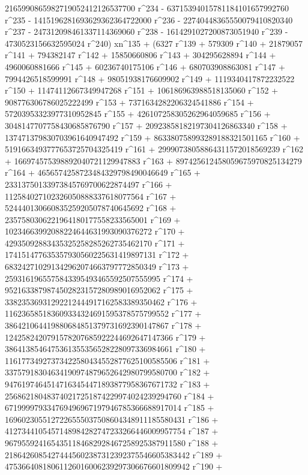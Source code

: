        2165990865982719052412126537700 r^234 - 
       63715394015781184101657992760 r^235 - 
       1415196281693629362364722000 r^236 - 
       22740448365550079410820340 r^237 - 
       247312098461337114369060 r^238 - 
       1614291027200873051940 r^239 - 
       4730523156632595024 r^240) xn^135 + (6327 r^139 + 
       579309 r^140 + 21879057 r^141 + 794382147 r^142 + 
       15850660806 r^143 + 304295628894 r^144 + 4960060881666 r^145 + 
       60236740175106 r^146 + 680703908863081 r^147 + 
       7994426518599991 r^148 + 98051938176609902 r^149 + 
       1119340417872232522 r^150 + 11474112667349947268 r^151 + 
       106186963988518135060 r^152 + 908776306786025222499 r^153 + 
       7371634282206324541886 r^154 + 57203953323977310952845 r^155 + 
       426107258305262964059685 r^156 + 
       3048147707758430685876790 r^157 + 
       20923858182197304126863340 r^158 + 
       137471379830703961640947492 r^159 + 
       863380758993289188321501165 r^160 + 
       5191663493777653725704325419 r^161 + 
       29990738058864311572018569239 r^162 + 
       166974575398892040721129947883 r^163 + 
       897425612458059675970825134279 r^164 + 
       4656574258723484329798490046649 r^165 + 
       23313750133973845769700622874497 r^166 + 
       112584027102326050888337618077564 r^167 + 
       524440130660835259205078740645692 r^168 + 
       2357580306221964180177558233565001 r^169 + 
       10234663992088224644631993090376272 r^170 + 
       42935092883435325258285262735462170 r^171 + 
       174151477635357930560225631419897131 r^172 + 
       683242710291342962074663797772850349 r^173 + 
       2593161965575843395493465592507555995 r^174 + 
       9521633879874502823157280989016952062 r^175 + 
       33823536931292212444917162583389350462 r^176 + 
       116236585183609334324691595378575799552 r^177 + 
       386421064419880684851379731692390147867 r^178 + 
       1242582420791578207685922244692647147366 r^179 + 
       3864138546475361355356528228097336984661 r^180 + 
       11617734927373422580434552877625100585506 r^181 + 
       33757918304634190974879652642980799580700 r^182 + 
       94761974645147163454471893877958367671732 r^183 + 
       256862180483740217251874229974024239294760 r^184 + 
       671999979334769496967197946785366688917014 r^185 + 
       1696023055127226555037508604348911185580431 r^186 + 
       4127344105457148984282747233266446009957754 r^187 + 
       9679559241654351184682928467258925387911580 r^188 + 
       21864260854274445602387312392375546605383442 r^189 + 
       47536640818061126016006239297306676601809942 r^190 + 
